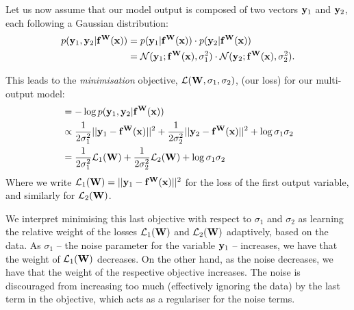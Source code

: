 Let us now assume that our model output is composed of two vectors $\mathbf{y}_1$ and $\mathbf{y}_2$, each following a Gaussian distribution:
\begin{equation}
\begin{split}
p(\mathbf{y}_1, \mathbf{y}_2 | \mathbf{f}^{\mathbf{W}}(\mathbf{x})) &= 
p(\mathbf{y}_1 | \mathbf{f}^{\mathbf{W}}(\mathbf{x})) \cdot p(\mathbf{y}_2 | \mathbf{f}^{\mathbf{W}}(\mathbf{x})) \\
&= 
\mathcal{N}(\mathbf{y}_1; \mathbf{f}^{\mathbf{W}}(\mathbf{x}), \sigma_1^2) \cdot
\mathcal{N}(\mathbf{y}_2; \mathbf{f}^{\mathbf{W}}(\mathbf{x}), \sigma_2^2).
\end{split}
\end{equation}

This leads to the \textit{minimisation} objective, $\mathcal{L}(\mathbf{W}, \sigma_1, \sigma_2)$, (our loss) for our multi-output model:
\begin{equation}
\begin{split}
 &= 
- \log p(\mathbf{y}_1, \mathbf{y}_2 | \mathbf{f}^{\mathbf{W}}(\mathbf{x})) \\
&\propto
\frac{1}{2 \sigma_1^2} ||\mathbf{y}_1 - \mathbf{f}^{\mathbf{W}}(\mathbf{x})||^2
+ \frac{1}{2 \sigma_2^2} ||\mathbf{y}_2 - \mathbf{f}^{\mathbf{W}}(\mathbf{x})||^2 
+ \log \sigma_1 \sigma_2 \\
&= \frac{1}{2 \sigma_1^2} \mathcal{L}_1(\mathbf{W}) 
+ \frac{1}{2 \sigma_2^2} \mathcal{L}_2(\mathbf{W})
+ \log \sigma_1 \sigma_2
\end{split}
\end{equation}
Where we write $\mathcal{L}_1(\mathbf{W}) = ||\mathbf{y}_1 - \mathbf{f}^{\mathbf{W}}(\mathbf{x})||^2$ for the loss of the first output variable, and similarly for $\mathcal{L}_2(\mathbf{W})$.


We interpret minimising this last objective with respect to $\sigma_1$ and $\sigma_2$ as learning the relative weight of the losses $\mathcal{L}_1(\mathbf{W})$ and $\mathcal{L}_2(\mathbf{W})$ adaptively, based on the data. As $\sigma_1$ -- the noise parameter for the variable $\mathbf{y}_1$ -- increases, we have that the weight of $\mathcal{L}_1(\mathbf{W})$ decreases. On the other hand, as the noise decreases, we have that the weight of the respective objective increases. The noise is discouraged from increasing too much (effectively ignoring the data) by the last term in the objective, which acts as a regulariser for the noise terms.

